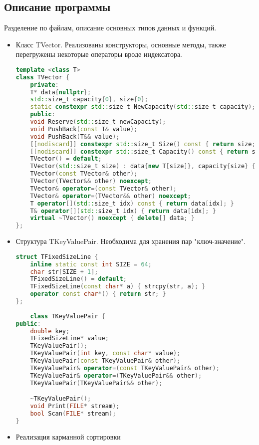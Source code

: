\documentclass[12pt]{article}
\begin{document}
\subsection*{Описание программы}

Разделение по файлам, описание основных типов данных и функций. \\
\begin{itemize}
    \item
        Класс TVector. Реализованы конструкторы, основные методы, также перегружены некоторые операторы вроде индексатора.
        \begin{lstlisting}[language=C++]
template <class T>
class TVector {
    private:
    T* data{nullptr};
    std::size_t capacity{0}, size{0};
    static constexpr std::size_t NewCapacity(std::size_t capacity);
    public:
    void Reserve(std::size_t newCapacity);
    void PushBack(const T& value);
    void PushBack(T&& value);
    [[nodiscard]] constexpr std::size_t Size() const { return size; }
    [[nodiscard]] constexpr std::size_t Capacity() const { return size; }
    TVector() = default;
    TVector(std::size_t size) : data{new T[size]}, capacity{size} {}
    TVector(const TVector& other);
    TVector(TVector&& other) noexcept;
    TVector& operator=(const TVector& other);
    TVector& operator=(TVector&& other) noexcept;
    T operator[](std::size_t idx) const { return data[idx]; }
    T& operator[](std::size_t idx) { return data[idx]; }
    virtual ~TVector() noexcept { delete[] data; }
};
        \end{lstlisting}
    \item
     Структура TKeyValuePair. Необходима для хранения пар "ключ-значение".
        \begin{lstlisting}[language=C++]
struct TFixedSizeLine {
    inline static const int SIZE = 64;
    char str[SIZE + 1];
    TFixedSizeLine() = default;
    TFixedSizeLine(const char* a) { strcpy(str, a); }
    operator const char*() { return str; }
};
        
    class TKeyValuePair {
public:
    double key;
    TFixedSizeLine* value;
    TKeyValuePair();
    TKeyValuePair(int key, const char* value);
    TKeyValuePair(const TKeyValuePair& other);
    TKeyValuePair& operator=(const TKeyValuePair& other);
    TKeyValuePair& operator=(TKeyValuePair&& other);
    TKeyValuePair(TKeyValuePair&& other);

    ~TKeyValuePair();
    void Print(FILE* stream);
    bool Scan(FILE* stream);
}
        \end{lstlisting}
    \item
        Реализация карманной сортировки
        \begin{lstlisting}[language=C++]


\end{lstlisting}
\end{itemize}
\end{document}

